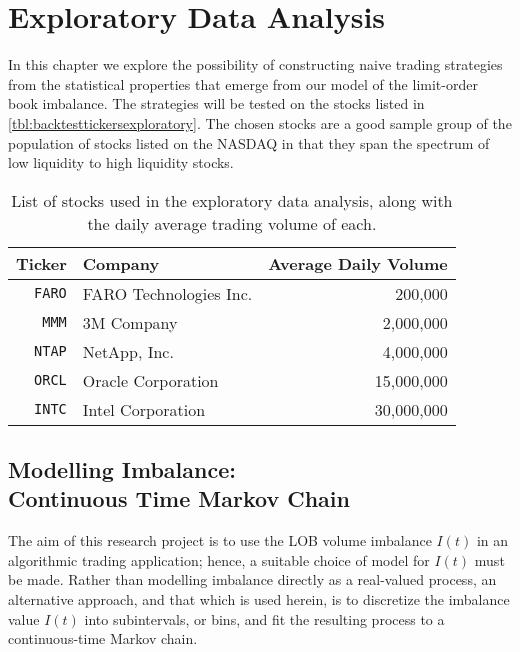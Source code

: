 \chapter{Exploratory Data Analysis}

In this chapter we explore the possibility of constructing naive trading strategies from the statistical properties that emerge from our model of the limit-order book imbalance. The strategies will be tested on the stocks listed in \autoref{tbl:backtesttickersexploratory}. The chosen stocks are a good sample group of the population of stocks listed on the NASDAQ in that they span the spectrum of low liquidity to high liquidity stocks.

\begin{table}[H]%
\centering%
%
\caption[Stocks used in the exploratory data analysis]{List of stocks used in the exploratory data analysis, along with the daily average trading volume of each.}\label{tbl:backtesttickersexploratory}%
\begin{tabular}{@{} rlr @{}}%
\toprule
Ticker & Company & Average Daily Volume \\
\midrule
\texttt{FARO} & FARO Technologies Inc. & 200,000 \\
\texttt{MMM} & 3M Company & 2,000,000 \\
\texttt{NTAP} & NetApp, Inc. & 4,000,000 \\
\texttt{ORCL} & Oracle Corporation & 15,000,000 \\
\texttt{INTC} & Intel Corporation & 30,000,000 \\
\bottomrule
\end{tabular}%
\end{table}%

\section[Modelling Imbalance: Continuous Time Markov Chain]{Modelling Imbalance: \texorpdfstring{\\}{} Continuous Time Markov Chain}
The aim of this research project is to use the LOB volume imbalance $I(t)$ in an algorithmic trading application; hence, a suitable choice of model for $I(t)$ must be made. Rather than modelling imbalance directly as a real-valued process, an alternative approach, and that which is used herein, is to discretize the imbalance value $I(t)$ into subintervals, or bins, and fit the resulting process to a continuous-time Markov chain.

